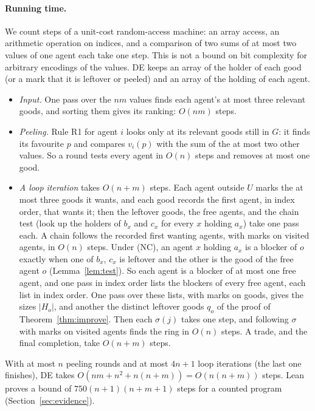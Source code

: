 \documentclass[runningheads,11pt]{llncs}
\newcommand{\DE}{\textup{DE}}
\begin{document}
\paragraph{Running time.} We count steps of a unit-cost random-access machine: an array access, an arithmetic operation on indices, and a comparison of two sums of at most two values of one agent each take one step. This is not a bound on bit complexity for arbitrary encodings of the values. \DE{} keeps an array of the holder of each good (or a mark that it is leftover or peeled) and an array of the holding of each agent.
\begin{itemize}
\item \emph{Input.} One pass over the $nm$ values finds each agent's at most three relevant goods, and sorting them gives its ranking: $O(nm)$ steps.
\item \emph{Peeling.} Rule R1 for agent $i$ looks only at its relevant goods still in $G$: it finds its favourite $p$ and compares $v_i(p)$ with the sum of the at most two other values. So a round tests every agent in $O(n)$ steps and removes at most one good.
\item \emph{A loop iteration} takes $O(n+m)$ steps. Each agent outside $U$ marks the at most three goods it wants, and each good records the first agent, in index order, that wants it; then the leftover goods, the free agents, and the chain test (look up the holders of $b_x$ and $c_x$ for every $x$ holding $a_x$) take one pass each. A chain follows the recorded first wanting agents, with marks on visited agents, in $O(n)$ steps. Under (NC), an agent $x$ holding $a_x$ is a blocker of $o$ exactly when one of $b_x$, $c_x$ is leftover and the other is the good of the free agent $o$ (Lemma~\ref{lem:test}). So each agent is a blocker of at most one free agent, and one pass in index order lists the blockers of every free agent, each list in index order. One pass over these lists, with marks on goods, gives the sizes $|H_o|$, and another the distinct leftover goods $q_o$ of the proof of Theorem~\ref{thm:improve}. Then each $\sigma(j)$ takes one step, and following $\sigma$ with marks on visited agents finds the ring in $O(n)$ steps. A trade, and the final completion, take $O(n+m)$ steps.
\end{itemize}
With at most $n$ peeling rounds and at most $4n+1$ loop iterations (the last one finishes), \DE{} takes $O(nm+n^2+n(n+m))=O(n(n+m))$ steps. Lean proves a bound of $750(n+1)(n+m+1)$ steps for a counted program (Section~\ref{sec:evidence}).
\end{document}
